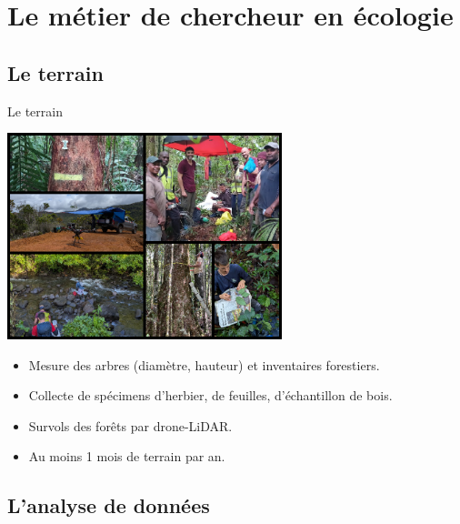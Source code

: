 \documentclass[10pt,table,dvipsnames,compress]{beamer}
\begin{document}
\section{Le métier de chercheur en écologie}
\label{sec:orgf0f9660}

\subsection{Le terrain}
\label{sec:org80f10be}

\begin{frame}[label={sec:orgaa0cfc6}]{Le terrain}
\begin{center}
\includegraphics[width=0.6\textwidth]{figs/terrain-collage.png}
\end{center}

\begin{itemize}
\item Mesure des arbres (diamètre, hauteur) et inventaires forestiers.
\item Collecte de spécimens d'herbier, de feuilles, d'échantillon de bois.
\item Survols des forêts par drone-LiDAR.
\item Au moins 1 mois de terrain par an.
\end{itemize}
\end{frame}
\subsection{L'analyse de données}
\label{sec:org3d63e1b}
\end{document}

